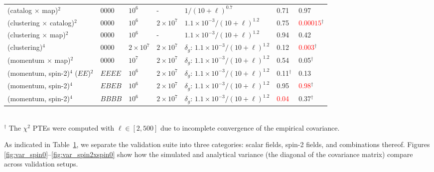 \documentclass[aps,twocolumn, superscriptaddress, english, nofootinbib, 10pt]{revtex4-2}
\begin{document}
\begin{table}[t]
\begin{tabular}{@{} l l l l l p{} p{}@{}}
    (catalog $\times$ map)$^2$
    & $0000$
    & $10^6$
    & -
    & $1/(10+\ell)^{0.7}$
    & 0.71 & 0.97 \\
    
    (clustering $\times$ catalog)$^2$
    & $0000$
    & $10^6$
    & $2\times 10^7$
    & $1.1\times10^{-3}/(10+\ell)^{1.2}$
    & 0.75 & \textcolor{red}{$0.00015$}$^\dagger$\\
    
    (clustering $\times$ map)$^2$
    & $0000$
    & $10^6$
    & -
    & $1.1\times10^{-3}/(10+\ell)^{1.2}$
    & 0.94 & 0.42 \\
    
    (clustering)$^4$
    & $0000$
    & $2\times 10^7$
    & $2\times 10^7$
    & $\delta_g$: $1.1\times10^{-3}/(10+\ell)^{1.2}$  %
    & 0.12 & \textcolor{red}{0.003}$^\dagger$\\
    
    (momentum $\times$ map)$^2$
    & $0000$
    & $10^7$
    & $2\times 10^7$
    & $\delta_g$: $1.1\times10^{-3}/(10+\ell)^{1.2}$ %
    & 0.54 & 0.05$^\dagger$ \\

    (momentum, spin-2)$^4$ ($EE$)$^2$
    & $EEEE$
    & $10^6$
    & $2\times 10^7$
    & $\delta_g$: $1.1\times10^{-3}/(10+\ell)^{1.2}$
    & 0.11$^\dagger$ &  0.13\\

    (momentum, spin-2)$^4$
    & $EBEB$
    & $10^6$
    & $2\times 10^7$
    & $\delta_g$: $1.1\times10^{-3}/(10+\ell)^{1.2}$
    & 0.95 & \textcolor{red}{0.98}$^\dagger$\\

    (momentum, spin-2)$^4$
    & $BBBB$
    & $10^6$
    & $2\times 10^7$
    & $\delta_g$: $1.1\times10^{-3}/(10+\ell)^{1.2}$
    & \textcolor{red}{0.04} & 0.37$^\dagger$\\

    \bottomrule
    \end{tabular} \label{tab:validation} \\
    \footnotesize{$^\dagger$ The $\chi^2$ PTEs were computed with $\ell\in[2, 500]$ due to incomplete convergence of the empirical covariance.}
    \end{table}

    As indicated in Table~\ref{tab:validation}, we separate the validation suite into three categories: scalar fields, spin-2 fields, and combinations thereof.  Figures \ref{fig:var_spin0}--\ref{fig:var_spin2xspin0} show how the simulated and analytical variance (the diagonal of the covariance matrix) compare across validation setups.
    
\end{document}
